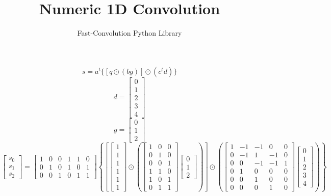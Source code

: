 \documentclass{article}%
\title{Numeric 1D Convolution}%
\author{Fast{-}Convolution Python Library}%
\begin{document}
%
\normalsize%
\maketitle%
\[%
s = a^t \{[q \odot (bg)] \odot (c^t d)\}%
\]%
\[%
d = \left[\begin{matrix}0\\1\\2\\3\\4\end{matrix}\right]%
\]%
\[%
g = \left[\begin{matrix}0\\1\\2\end{matrix}\right]%
\]%
\[%
\left[\begin{matrix}s_{0}\\s_{1}\\s_{2}\end{matrix}\right] = \left[\begin{matrix}1 & 0 & 0 & 1 & 1 & 0\\0 & 1 & 0 & 1 & 0 & 1\\0 & 0 & 1 & 0 & 1 & 1\end{matrix}\right] \left\{ \left[ \left[\begin{matrix}1\\1\\1\\1\\1\\1\end{matrix}\right] \odot \left( \left[\begin{matrix}1 & 0 & 0\\0 & 1 & 0\\0 & 0 & 1\\1 & 1 & 0\\1 & 0 & 1\\0 & 1 & 1\end{matrix}\right] \left[\begin{matrix}0\\1\\2\end{matrix}\right] \right) \right] \odot \left( \left[\begin{matrix}1 & -1 & -1 & 0 & 0\\0 & -1 & 1 & -1 & 0\\0 & 0 & -1 & -1 & 1\\0 & 1 & 0 & 0 & 0\\0 & 0 & 1 & 0 & 0\\0 & 0 & 0 & 1 & 0\end{matrix}\right] \left[\begin{matrix}0\\1\\2\\3\\4\end{matrix}\right] \right) \right\}%
\]%
\end{document}
